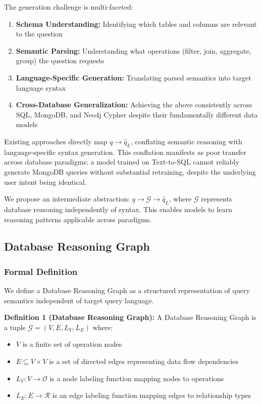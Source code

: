 \documentclass[conference]{IEEEtran}
\begin{document}
The generation challenge is multi-faceted:
\begin{enumerate}
\item \textbf{Schema Understanding:} Identifying which tables and columns are relevant to the question
\item \textbf{Semantic Parsing:} Understanding what operations (filter, join, aggregate, group) the question requests
\item \textbf{Language-Specific Generation:} Translating parsed semantics into target language syntax
\item \textbf{Cross-Database Generalization:} Achieving the above consistently across SQL, MongoDB, and Neo4j Cypher despite their fundamentally different data models
\end{enumerate}

Existing approaches directly map $q \to \hat{q}_L$, conflating semantic reasoning with language-specific syntax generation. This conflation manifests as poor transfer across database paradigms: a model trained on Text-to-SQL cannot reliably generate MongoDB queries without substantial retraining, despite the underlying user intent being identical.

We propose an intermediate abstraction: $q \to \mathcal{G} \to \hat{q}_L$, where $\mathcal{G}$ represents database reasoning independently of syntax. This enables models to learn reasoning patterns applicable across paradigms.

\subsection{Database Reasoning Graph}
\label{sec:drg}

\subsubsection{Formal Definition}

We define a Database Reasoning Graph as a structured representation of query semantics independent of target query language.

\textbf{Definition 1 (Database Reasoning Graph):} A Database Reasoning Graph is a tuple $\mathcal{G} = (V, E, L_V, L_E)$ where:
\begin{itemize}
\item $V$ is a finite set of operation nodes
\item $E \subseteq V \times V$ is a set of directed edges representing data flow dependencies
\item $L_V: V \to \mathcal{O}$ is a node labeling function mapping nodes to operations
\item $L_E: E \to \mathcal{R}$ is an edge labeling function mapping edges to relationship types
\end{itemize}
\end{document}
